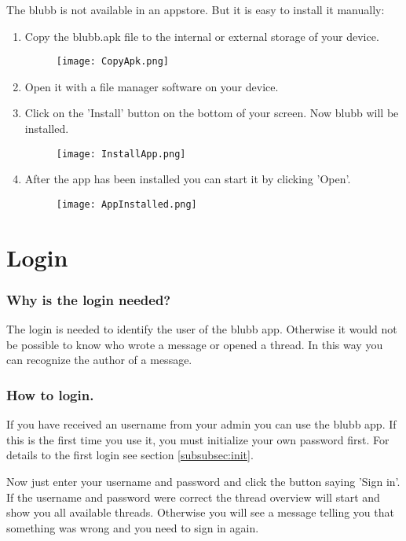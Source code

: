 \documentclass[12pt,a4paper,oneside]{report}
\newcommand{\appname}{blubb}
\begin{document}
The \appname{} is not available in an appstore. But it is easy to install it manually:
\begin{enumerate}
\item Copy the blubb.apk file to the internal or external storage of your device.
\begin{figure}[!ht]
    \texttt{[image: CopyApk.png]}
\end{figure}
\item Open it with a file manager software on your device.
\item Click on the 'Install' button on the bottom of your screen. Now \appname{} will be installed.

\begin{figure}[!ht]
    \texttt{[image: InstallApp.png]}
\end{figure}

\item After the app has been installed you can start it by clicking 'Open'.


\begin{figure}[!ht]
    \texttt{[image: AppInstalled.png]}
\end{figure}

\end{enumerate}

\section{Login}
\subsubsection{Why is the login needed?}
The login is needed to identify the user of the \appname{} app. Otherwise it would not be possible to know who wrote a message or opened a thread. In this way you can recognize the author of a message.

\subsubsection{How to login.}
If you have received an username from your admin you can use the \appname{} app. If this is the first time you use it, you must initialize your own password first. For details to the first login see section \ref{subsubsec:init}.

Now just enter your username and password and click the button saying 'Sign in'. If the username and password were correct the thread overview will start and show you all available threads. Otherwise you will see a message telling you that something was wrong and you need to sign in again.
\end{document}
